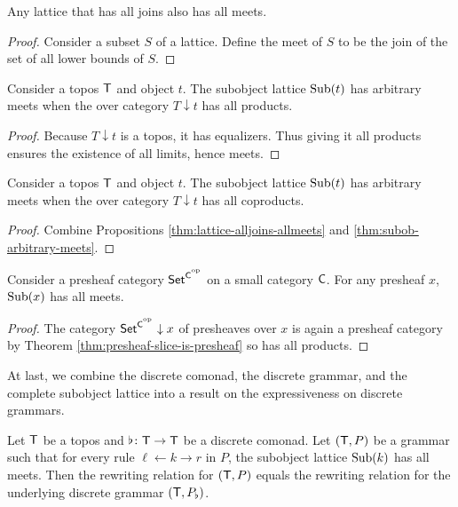 \documentclass{amsart}
\begin{document}
\begin{proposition} \label{thm:lattice-alljoins-allmeets}
  Any lattice that has all joins also has all meets.
\end{proposition}

\begin{proof}
  Consider a subset $ S $ of a lattice. Define the meet of $
  S $ to be the join of the set of all lower bounds of $ S $.
\end{proof}

\begin{proposition} \label{thm:subob-arbitrary-meets}
  Consider a topos $ \mathsf{T} $ and object $ t $.  The subobject
  lattice $ \operatorname{Sub} (t) $ has arbitrary meets when the over
  category $ T \downarrow t $ has all products.
\end{proposition}

\begin{proof}
  Because $ T \downarrow t $ is a topos, it has
  equalizers. Thus giving it all products ensures the
  existence of all limits, hence meets. 
\end{proof}

\begin{corollary}
  Consider a topos $ \mathsf{T} $ and object $ t $.  The subobject
  lattice $ \operatorname{Sub} (t) $ has arbitrary meets when the over
  category $ T \downarrow t $ has all coproducts.
\end{corollary}

\begin{proof}
  Combine Propositions \ref{thm:lattice-alljoins-allmeets}
  and \ref{thm:subob-arbitrary-meets}.
\end{proof}

\begin{corollary}
  Consider a presheaf category $ \mathsf{Set}^{ \mathsf{C}^{^{\scriptsize{ \textrm{op} } }} } $ on a
  small category $ \mathsf{C} $. For any presheaf $ x $,
  $ \operatorname{Sub} (x) $ has all meets.
\end{corollary}

\begin{proof}
  The category $ \mathsf{Set}^{ \mathsf{C}^{^{\scriptsize{ \textrm{op} } }} } \downarrow x $ of
  presheaves over $ x $ is again a presheaf category by
  Theorem \ref{thm:presheaf-slice-is-presheaf} so has all
  products.
\end{proof}

At last, we combine the discrete comonad, the discrete
grammar, and the complete subobject lattice into a result on
the expressiveness on discrete grammars.

\begin{theorem}
  \label{thm:production-same-rewrite-relation-as-discrete}  
  Let $ \mathsf{T} $ be a topos and $ \flat \colon \mathsf{T} \to \mathsf{T} $ be a
  discrete comonad.  Let $ ( \mathsf{T} , P ) $ be a grammar such
  that for every rule $ \ell \gets k \to r $ in $ P $, the
  subobject lattice $ \operatorname{Sub} (k) $ has all meets. Then the
  rewriting relation for $ ( \mathsf{T} , P ) $ equals the
  rewriting relation for the underlying discrete grammar
  $ ( \mathsf{T},P_\flat ) $.
\end{theorem}
\end{document}
